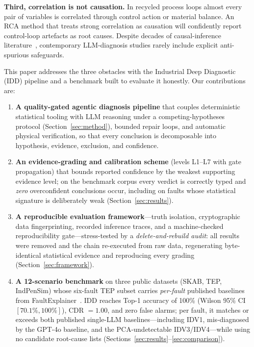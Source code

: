 \documentclass[journal]{IEEEtran}
\begin{document}
\textbf{Third, correlation is not causation.} In recycled process loops almost every pair of variables is correlated through control action or material balance. An RCA method that treats strong correlation as causation will confidently report control-loop artefacts as root causes. Despite decades of causal-inference literature~\cite{katal2024causal}, contemporary LLM-diagnosis studies rarely include explicit anti-spurious safeguards.

This paper addresses the three obstacles with the Industrial Deep Diagnostic (IDD) pipeline and a benchmark built to evaluate it honestly. Our contributions are:

\begin{enumerate}
\item \textbf{A quality-gated agentic diagnosis pipeline} that couples deterministic statistical tooling with LLM reasoning under a competing-hypotheses protocol (Section~\ref{sec:method}), bounded repair loops, and automatic physical verification, so that every conclusion is decomposable into hypothesis, evidence, exclusion, and confidence.
\item \textbf{An evidence-grading and calibration scheme} (levels L1--L7 with gate propagation) that bounds reported confidence by the weakest supporting evidence level; on the benchmark corpus every verdict is correctly typed and \emph{zero} overconfident conclusions occur, including on faults whose statistical signature is deliberately weak (Section~\ref{sec:results}).
\item \textbf{A reproducible evaluation framework}---truth isolation, cryptographic data fingerprinting, recorded inference traces, and a machine-checked reproducibility gate---stress-tested by a \emph{delete-and-rebuild audit}: all results were removed and the chain re-executed from raw data, regenerating byte-identical statistical evidence and reproducing every grading (Section~\ref{sec:framework}).
\item \textbf{A 12-scenario benchmark} on three public datasets (SKAB, TEP, IndPenSim) whose six-fault TEP subset carries \emph{per-fault} published baselines from FaultExplainer~\cite{khan2024faultexplainer}. IDD reaches Top-1 accuracy of 100\% (Wilson 95\% CI $[70.1\%,100\%]$), CDR $=1.00$, and zero false alarms; per fault, it matches or exceeds both published single-LLM baselines---including IDV1, mis-diagnosed by the GPT-4o baseline, and the PCA-undetectable IDV3/IDV4---while using no candidate root-cause lists (Sections~\ref{sec:results}--\ref{sec:comparison}).
\end{enumerate}
\end{document}
